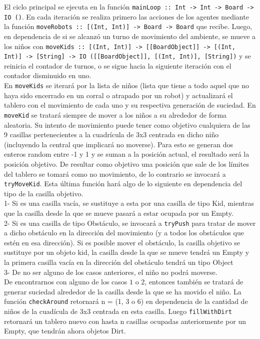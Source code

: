 \documentclass[a4paper,12pt]{article}
\def\code#1{\texttt{#1}}
\begin{document}
El ciclo principal se ejecuta en la función \code{mainLoop :: Int -> Int -> Board -> IO ()}. En cada iteración se realiza primero las acciones de los agentes mediante la función \code{moveRobots :: [(Int, Int)] -> Board -> Board} que recibe. Luego, en dependencia de si se alcanzó un turno de movimiento del ambiente, se mueve a los niños con \code{moveKids :: [(Int, Int)] -> [[BoardObject]] -> [(Int, Int)] -> [String] -> IO ([[BoardObject]], [(Int, Int)], [String])} y se reinicia el contador de turnos, o se sigue hacia la siguiente iteración con el contador disminuido en uno.\\

En \code{moveKids} se iterará por la lista de niños (lista que tiene a todo aquel que no haya sido encerrado en un corral o atrapado por un robot) y actualizará el tablero con el movimiento de cada uno y su respectiva generación de suciedad. En \code{moveKid} se tratará siempre de mover a los niños a su alrededor de forma aleatoria. Su intento de movimiento puede tener como objetivo cualquiera de las 9 casillas pertenecientes a la cuadrícula de 3x3 centrada en dicho niño (incluyendo la central que implicará no moverse). Para esto se generan dos enteros random entre -1 y 1 y se suman a la posición actual, el resultado será la posición objetivo. De resultar como objetivo una posición que sale de los límites del tablero se tomará como no movimiento, de lo contrario se invocará a \code{tryMoveKid}. Esta última función hará algo de lo siguiente en dependencia del tipo de la casilla objetivo.\\
1- Si es una casilla vacía, se sustituye a esta por una casilla de tipo Kid, mientras que la casilla desde la que se mueve pasará a estar ocupada por un Empty.\\
2- Si es una casilla de tipo Obstáculo, se invocará a \code{tryPush} para tratar de mover a dicho obstáculo en la dirección del movimiento (y a todos los obstáculos que estén en esa dirección). Si es posible mover el obstáculo, la casilla objetivo se sustituye por un objeto kid, la casilla desde la que se mueve tendrá un Empty y la primera casilla vacía en la dirección del obstáculo tendrá un tipo Object\\
3- De no ser alguno de los casos anteriores, el niño no podrá moverse.\\
De encontrarnos con alguno de los casos $1$ o $2$, entonces también se tratará de generar suciedad alrededor de la casilla desde la que se ha movido el niño. La función \code{checkAround} retornará n = (1, 3 o 6) en dependencia de la cantidad de niños de la cuadícula de 3x3 centrada en esta casilla. Luego \code{fillWithDirt} retornará un tablero nuevo con hasta n casillas ocupadas anteriormente por un Empty, que tendrán ahora objetos Dirt.\\
\end{document}
